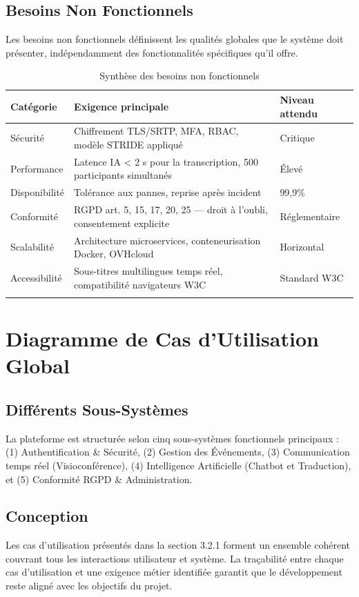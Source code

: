 \subsection{Besoins Non Fonctionnels}
Les besoins non fonctionnels définissent les qualités globales que le système doit présenter, indépendamment des fonctionnalités spécifiques qu'il offre.

\begin{longtable}{|m{3cm}|m{6cm}|m{3cm}|}
\hline
\textbf{Catégorie} & \textbf{Exigence principale} & \textbf{Niveau attendu} \\
\hline
\endhead
\endfoot
\endlastfoot
\hline
Sécurité & Chiffrement TLS/SRTP, MFA, RBAC, modèle STRIDE appliqué & Critique \\
\hline
Performance & Latence IA < 2 s pour la transcription, 500 participants simultanés & Élevé \\
\hline
Disponibilité & Tolérance aux pannes, reprise après incident & 99,9\% \\
\hline
Conformité & RGPD art. 5, 15, 17, 20, 25 — droit à l'oubli, consentement explicite & Réglementaire \\
\hline
Scalabilité & Architecture microservices, conteneurisation Docker, OVHcloud & Horizontal \\
\hline
Accessibilité & Sous-titres multilingues temps réel, compatibilité navigateurs W3C & Standard W3C \\
\hline
\captionsetup{justification=centering,margin=2cm}
\caption{Synthèse des besoins non fonctionnels}
\label{tab:nfr}
\end{longtable}

\section{Diagramme de Cas d'Utilisation Global}

\subsection{Différents Sous-Systèmes}
La plateforme est structurée selon cinq sous-systèmes fonctionnels principaux : (1) Authentification \& Sécurité, (2) Gestion des Événements, (3) Communication temps réel (Visioconférence), (4) Intelligence Artificielle (Chatbot et Traduction), et (5) Conformité RGPD \& Administration.

\subsection{Conception}
Les cas d'utilisation présentés dans la section 3.2.1 forment un ensemble cohérent couvrant tous les interactions utilisateur et système. La traçabilité entre chaque cas d'utilisation et une exigence métier identifiée garantit que le développement reste aligné avec les objectifs du projet.


